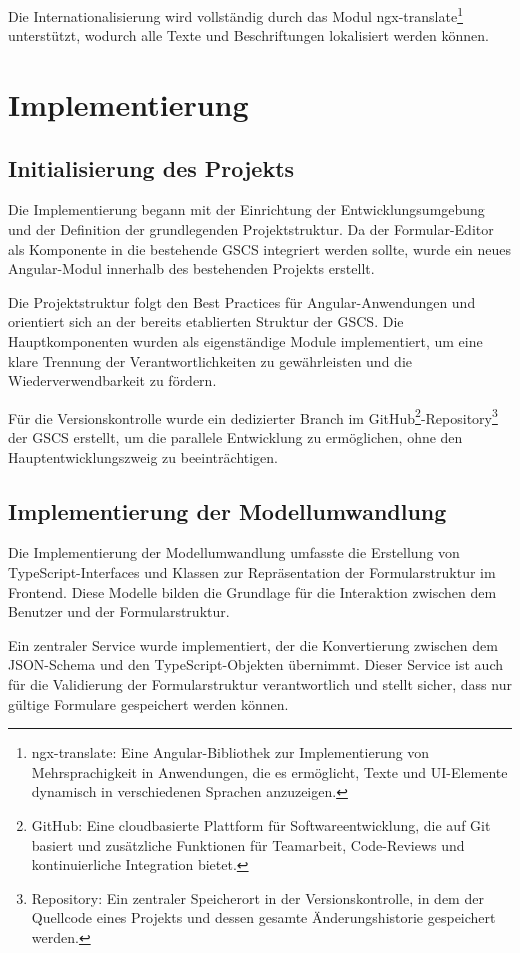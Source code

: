 \documentclass[a4paper,11pt]{article}
\begin{document}
\noindent Die Internationalisierung wird vollständig durch das Modul ngx-translate\footnote{ngx-translate: Eine Angular-Bibliothek zur Implementierung von Mehrsprachigkeit in Anwendungen, die es ermöglicht, Texte und UI-Elemente dynamisch in verschiedenen Sprachen anzuzeigen.} unterstützt, wodurch alle Texte und Beschriftungen lokalisiert werden können.
\section{Implementierung}
\subsection{Initialisierung des Projekts}
Die Implementierung begann mit der Einrichtung der Entwicklungsumgebung und der Definition der grundlegenden Projektstruktur. Da der Formular-Editor als Komponente in die bestehende GSCS integriert werden sollte, wurde ein neues Angular-Modul innerhalb des bestehenden Projekts erstellt.

\noindent Die Projektstruktur folgt den Best Practices für Angular-Anwendungen und orientiert sich an der bereits etablierten Struktur der GSCS. Die Hauptkomponenten wurden als eigenständige Module implementiert, um eine klare Trennung der Verantwortlichkeiten zu gewährleisten und die Wiederverwendbarkeit zu fördern.

\noindent Für die Versionskontrolle wurde ein dedizierter Branch im GitHub\footnote{GitHub: Eine cloudbasierte Plattform für Softwareentwicklung, die auf Git basiert und zusätzliche Funktionen für Teamarbeit, Code-Reviews und kontinuierliche Integration bietet.}-Repository\footnote{Repository: Ein zentraler Speicherort in der Versionskontrolle, in dem der Quellcode eines Projekts und dessen gesamte Änderungshistorie gespeichert werden.} der GSCS erstellt, um die parallele Entwicklung zu ermöglichen, ohne den Hauptentwicklungszweig zu beeinträchtigen.

\subsection{Implementierung der Modellumwandlung}
Die Implementierung der Modellumwandlung umfasste die Erstellung von TypeScript-Interfaces und Klassen zur Repräsentation der Formularstruktur im Frontend. Diese Modelle bilden die Grundlage für die Interaktion zwischen dem Benutzer und der Formularstruktur.

\noindent Ein zentraler Service wurde implementiert, der die Konvertierung zwischen dem JSON-Schema und den TypeScript-Objekten übernimmt. Dieser Service ist auch für die Validierung der Formularstruktur verantwortlich und stellt sicher, dass nur gültige Formulare gespeichert werden können.
\end{document}
